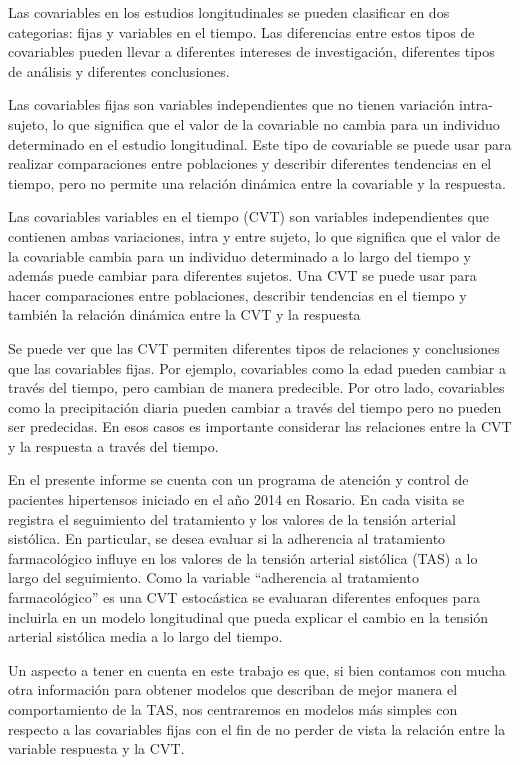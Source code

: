 \documentclass[spanish]{article}
\numberwithin{figure}{subsection}
\numberwithin{equation}{subsection}
\numberwithin{table}{subsection}
\def\fullcovname{adherencia al tratamiento farmacológico}
\begin{document}
Las covariables en los estudios longitudinales se pueden clasificar en dos
categorias: fijas y variables en el tiempo. Las diferencias entre estos tipos
de covariables pueden llevar a diferentes intereses de investigación,
diferentes tipos de análisis y diferentes conclusiones.

Las covariables fijas son variables independientes que no tienen variación
intra-sujeto, lo que significa que el valor de la covariable no cambia para un
individuo determinado en el estudio longitudinal. Este tipo de covariable se
puede usar para realizar comparaciones entre poblaciones y describir diferentes
tendencias en el tiempo, pero no permite una relación dinámica entre la
covariable y la respuesta.

Las covariables variables en el tiempo (CVT) son variables independientes que
contienen ambas variaciones, intra y entre sujeto, lo que significa que el
valor de la covariable cambia para un individuo determinado a lo largo del
tiempo y además puede cambiar para diferentes sujetos. Una CVT se puede usar
para hacer comparaciones entre poblaciones, describir tendencias en el tiempo y
también la relación dinámica entre la CVT y la respuesta

Se puede ver que las CVT permiten diferentes tipos de relaciones y conclusiones
que las covariables fijas. Por ejemplo, covariables como la edad pueden cambiar
a través del tiempo, pero cambian de manera predecible. Por otro lado,
covariables como la precipitación diaria pueden cambiar a través del tiempo
pero no pueden ser predecidas. En esos casos es importante considerar las
relaciones entre la CVT y la respuesta a través del tiempo.

En el presente informe se cuenta con un programa de atención y control de
pacientes hipertensos iniciado en el año 2014 en Rosario. En cada visita se
registra el seguimiento del tratamiento y los valores de la tensión arterial
sistólica. En particular, se desea evaluar si la adherencia al tratamiento
farmacológico influye en los valores de la tensión arterial sistólica (TAS) a
lo largo del seguimiento. Como la variable “\fullcovname{}” es una CVT
estocástica se evaluaran diferentes enfoques para incluirla en un modelo
longitudinal que pueda explicar el cambio en la tensión arterial sistólica
media a lo largo del tiempo.

Un aspecto a tener en cuenta en este trabajo es que, si bien contamos con mucha
otra información para obtener modelos que describan de mejor manera el
comportamiento de la TAS, nos centraremos en modelos más simples con respecto a
las covariables fijas con el fin de no perder de vista la relación entre la
variable respuesta y la CVT.
\end{document}
